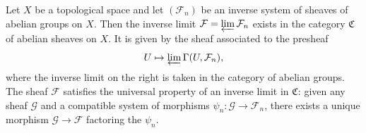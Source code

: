 Let $X$ be a topological space and let $(\mathcal{F}_n)$ be an inverse system of sheaves of abelian groups on $X$. Then the inverse limit $\mathcal{F} = \varprojlim \mathcal{F}_n$ exists in the category $\mathfrak{C}$ of abelian sheaves on $X$. It is given by the sheaf associated to the presheaf
$$U \mapsto \varprojlim \Gamma(U, \mathcal{F}_n),$$
where the inverse limit on the right is taken in the category of abelian groups. The sheaf $\mathcal{F}$ satisfies the universal property of an inverse limit in $\mathfrak{C}$: given any sheaf $\mathcal{G}$ and a compatible system of morphisms $\psi_n: \mathcal{G} \to \mathcal{F}_n$, there exists a unique morphism $\mathcal{G} \to \mathcal{F}$ factoring the $\psi_n$.
